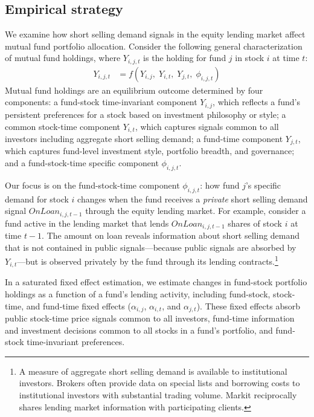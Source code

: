 
\subsection{Empirical strategy} \label{subsec:empirical-strategy}

We examine how short selling demand signals in the equity lending market affect mutual fund portfolio allocation. Consider the following general characterization of mutual fund holdings, where $Y_{i,j,t}$ is the holding for fund $j$ in stock $i$ at time $t$:
\begin{align} \label{eq:equil_allocation}
Y_{i,j,t} & = f\left(Y_{i,j},\; Y_{i,t},\; Y_{j,t},\; \phi_{i,j,t} \right)
\end{align}
Mutual fund holdings are an equilibrium outcome determined by four components: a fund-stock time-invariant component $Y_{i,j}$, which reflects a fund's persistent preferences for a stock based on investment philosophy or style; a common stock-time component $Y_{i,t}$, which captures signals common to all investors including aggregate short selling demand; a fund-time component $Y_{j,t}$, which captures fund-level investment style, portfolio breadth, and governance; and a fund-stock-time specific component $\phi_{i,j,t}$.

Our focus is on the fund-stock-time component $\phi_{i,j,t}$: how fund $j$'s specific demand for stock $i$ changes when the fund receives a \textit{private} short selling demand signal $OnLoan_{i,j,t-1}$ through the equity lending market. For example, consider a fund active in the lending market that lends $OnLoan_{i,j,t-1}$ shares of stock $i$ at time $t-1$. The amount on loan reveals information about short selling demand that is not contained in public signals---because public signals are absorbed by $Y_{i,t}$---but is observed privately by the fund through its lending contracts.\footnote{A measure of aggregate short selling demand is available to institutional investors. Brokers often provide data on special lists and borrowing costs to institutional investors with substantial trading volume. Markit reciprocally shares lending market information with participating clients.}

In a saturated fixed effect estimation, we estimate changes in fund-stock portfolio holdings as a function of a fund's lending activity, including fund-stock, stock-time, and fund-time fixed effects ($\alpha_{i,j}$, $\alpha_{i,t}$, and $\alpha_{j,t}$). These fixed effects absorb public stock-time price signals common to all investors, fund-time information and investment decisions common to all stocks in a fund's portfolio, and fund-stock time-invariant preferences.


